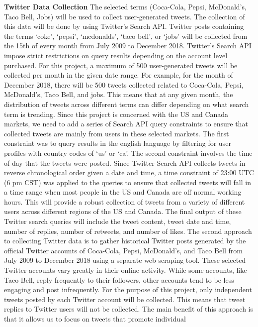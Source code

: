 \documentclass[12pt,oneside]{chicagocapstone}
\begin{document}
\textbf{Twitter Data Collection} The selected terms (Coca-Cola, Pepsi,
McDonald's, Taco Bell, Jobs) will be used to collect user-generated
tweets. The collection of this data will be done by using Twitter's
Search API. Twitter posts containing the terms `coke', `pepsi',
`mcdonalds', `taco bell', or `jobs' will be collected from the 15th of
every month from July 2009 to December 2018. Twitter's Search API impose
strict restrictions on query results depending on the account level
purchased. For this project, a maximum of 500 user-generated tweets will
be collected per month in the given date range. For example, for the
month of December 2018, there will be 500 tweets collected related to
Coca-Cola, Pepsi, McDonald's, Taco Bell, and jobs. This means that at
any given month, the distribution of tweets across different terms can
differ depending on what search term is trending. Since this project is
concerned with the US and Canada markets, we need to add a series of
Search API query constraints to ensure that collected tweets are mainly
from users in these selected markets. The first constraint was to query
results in the english language by filtering for user profiles with
country codes of `us' or `ca'. The second constraint involves the time
of day that the tweets were posted. Since Twitter Search API collects
tweets in reverse chronological order given a date and time, a time
constraint of 23:00 UTC (6 pm CST) was applied to the queries to ensure
that collected tweets will fall in a time range when most people in the
US and Canada are off normal working hours. This will provide a robust
collection of tweets from a variety of different users across different
regions of the US and Canada. The final output of these Twitter search
queries will include the tweet content, tweet date and time, number of
replies, number of retweets, and number of likes. The second approach to
collecting Twitter data is to gather historical Twitter posts generated
by the official Twitter accounts of Coca-Cola, Pepsi, McDonald's, and
Taco Bell from July 2009 to December 2018 using a separate web scraping
tool. These selected Twitter accounts vary greatly in their online
activity. While some accounts, like Taco Bell, reply frequently to their
followers, other accounts tend to be less engaging and post
infrequently. For the purpose of this project, only independent tweets
posted by each Twitter account will be collected. This means that tweet
replies to Twitter users will not be collected. The main benefit of this
approach is that it allows us to focus on tweets that promote individual
\end{document}

